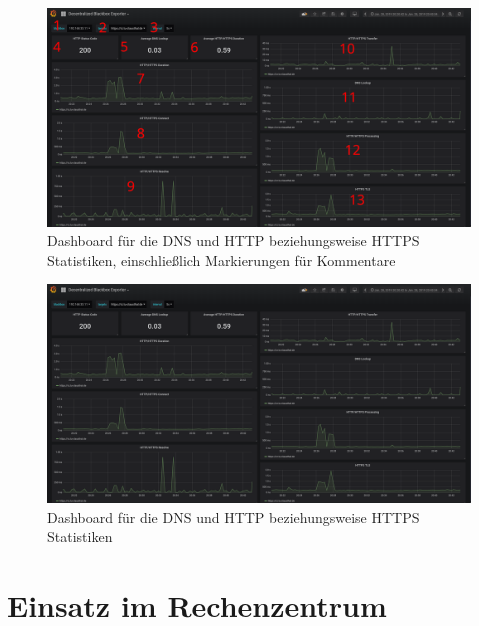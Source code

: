 \documentclass[titlepage]{report}
\begin{document}
\begin{figure}[H]
    \centering
    \includegraphics[width=1.0\textwidth]{figures/grafana_dashboard_numbers.png}
    \caption{Dashboard für die DNS und HTTP beziehungsweise HTTPS
    Statistiken, einschließlich Markierungen für
    Kommentare}\label{fig:grafanadashboardnumbers}
\end{figure}
\begin{figure}[H]
    \centering
    \includegraphics[width=1.0\textwidth]{figures/grafana_dashboard.png}
    \caption{Dashboard für die DNS und HTTP beziehungsweise HTTPS
    Statistiken}\label{fig:grafanadashboard}
\end{figure}
\section{Einsatz im Rechenzentrum}
\end{document}
